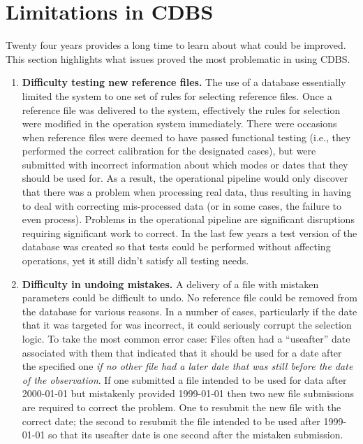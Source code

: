 \documentclass[final,authoryear,5p,times,twocolumn]{elsarticle}
\begin{document}
\section{Limitations in CDBS}

Twenty four years provides a long time to learn about what could be
improved. This section highlights what issues proved the most problematic in
using CDBS.

\begin{enumerate}
\item \textbf{Difficulty testing new reference files.} 
The use of a database essentially
limited the system to one set of rules for selecting reference files. Once a
reference file was delivered to the system, effectively the rules for selection
were modified in the operation system immediately. There were occasions when
reference files were deemed to have passed functional testing (i.e., they
performed the correct calibration for the designated cases), but were submitted
with incorrect information about which modes or dates that they should be used
for. As a result, the operational pipeline would only discover that there was a
problem when processing real data, thus resulting in having to deal with correcting
mis-processed data (or in some cases, the failure to even process). Problems in the
operational pipeline are significant disruptions requiring significant work
to correct. In the last few years a test
version of the database was created so that tests could be performed without
affecting operations, yet it still didn't satisfy all testing needs.

\item \textbf{Difficulty in undoing mistakes.}
A delivery of a file with mistaken
parameters could be difficult to undo. No reference file could be removed from
the database for various reasons. In a number of cases, particularly if the
date that it was targeted for was incorrect, it could seriously corrupt the
selection logic. To take the most common error case: Files often had a
``useafter'' date associated with them that indicated that it should be used for
a date after the specified one \textit{if no other file had a later date that was
still before the date of the observation}. If one submitted a file intended to
be used for data after 2000-01-01 but mistakenly provided
1999-01-01 then two new file submissions are required to correct the problem.
One to resubmit the new file with the correct date; the second to resubmit the file
intended to be used after 1999-01-01 so that its useafter date is one second after
the mistaken submission. 


\end{enumerate}
\end{document}
